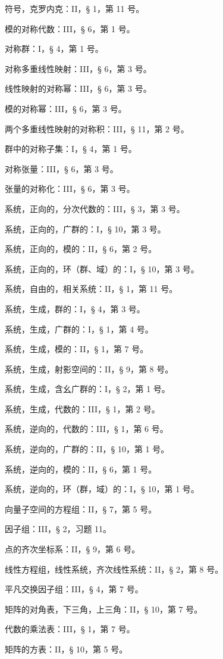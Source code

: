 符号，克罗内克：II，§ 1，第 11 号。

模的对称代数：III，§ 6，第 1 号。

对称群：I，§ 4，第 1 号。

对称多重线性映射：III，§ 6，第 3 号。

线性映射的对称幂：III，§ 6，第 3 号。

模的对称幂：III，§ 6，第 3 号。

两个多重线性映射的对称积：III，§ 11，第 2 号。

群中的对称子集：I，§ 4，第 1 号。

对称张量：III，§ 6，第 3 号。

张量的对称化：III，§ 6，第 3 号。

系统，正向的，分次代数的：III，§ 3，第 3 号。

系统，正向的，广群的：I，§ 10，第 3 号。

系统，正向的，模的：II，§ 6，第 2 号。

系统，正向的，环（群、域）的：I，§ 10，第 3 号。

系统，自由的，相关系统：II，§ 1，第 11 号。

系统，生成，群的：I，§ 4，第 3 号。

系统，生成，广群的：I，§ 1，第 4 号。

系统，生成，模的：II，§ 1，第 7 号。

系统，生成，射影空间的：II，§ 9，第 8 号。

系统，生成，含幺广群的：I，§ 2，第 1 号。

系统，生成，代数的：III，§ 1，第 2 号。

系统，逆向的，代数的：III，§ 1，第 6 号。

系统，逆向的，广群的：II，§ 10，第 1 号。

系统，逆向的，模的：II，§ 6，第 1 号。

系统，逆向的，环（群，域）的：I，§ 10，第 1 号。

向量子空间的方程组：II，§ 7，第 5 号。

因子组：III，§ 2，习题 11。

点的齐次坐标系：II，§ 9，第 6 号。

线性方程组，线性系统，齐次线性系统：II，§ 2，第 8 号。

平凡交换因子组：III，§ 4，第 7 号。

矩阵的对角表，下三角，上三角：II，§ 10，第 7 号。

代数的乘法表：III，§ 1，第 7 号。

矩阵的方表：II，§ 10，第 5 号。


